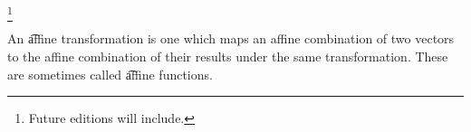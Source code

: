 
\footnote{Future editions will include.}


An \t{affine transformation} is one which maps an affine combination of two vectors to the affine combination of their results under the same transformation.
These are sometimes called \t{affine functions}.

\blankpage
